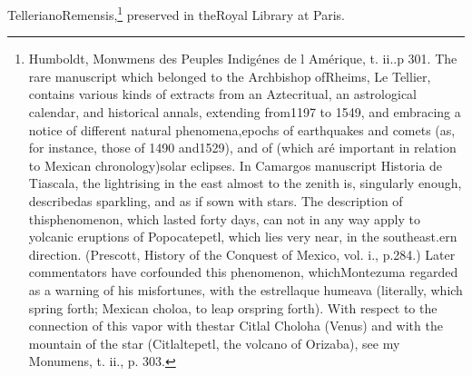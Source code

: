 TellerianoRemensis,\footnote{Humboldt, Monwmens des Peuples Indig\'{e}nes de l Am\'{e}rique, t. ii..p 301. The rare manuscript which belonged to the Archbishop ofRheims, Le Tellier, contains various kinds of extracts from an Aztecritual, an astrological calendar, and historical annals, extending from1197 to 1549, and embracing a notice of different natural phenomena,epochs of earthquakes and comets (as, for instance, those of 1490 and1529), and of (which ar\'{e} important in relation to Mexican chronology)solar eclipses. In Camargos manuscript Historia de Tiascala, the lightrising in the east almost to the zenith is, singularly enough, describedas sparkling, and as if sown with stars. The description of thisphenomenon, which lasted forty days, can not in any way apply to yolcanic eruptions of Popocatepetl, which lies very near, in the southeast.ern direction. (Prescott, History of the Conquest of Mexico, vol. i., p.284.) Later commentators have corfounded this phenomenon, whichMontezuma regarded as a warning of his misfortunes, with the estrellaque humeava (literally, which spring forth; Mexican choloa, to leap orspring forth). With respect to the connection of this vapor with thestar Citlal Choloha (Venus) and with the mountain of the star (Citlaltepetl, the volcano of Orizaba), see my Monumens, t. ii., p. 303.} preserved in theRoyal Library at Paris.



